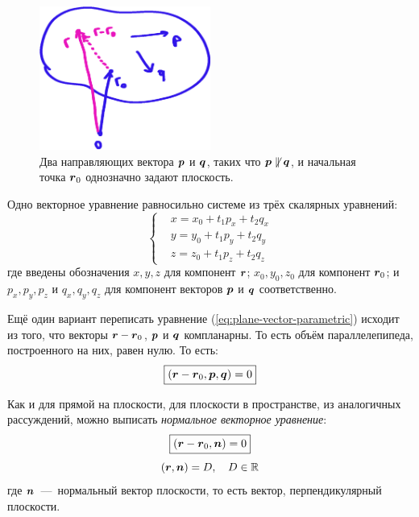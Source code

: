 \documentclass[a4paper,12pt]{article}
\begin{document}
  \begin{figure}[h]
    \centering
    
    \includegraphics[width=0.5\textwidth]{dot-and-two-vectors-on-the-plane}
    
    \caption{Два направляющих вектора $\boldsymbol p$ и $\boldsymbol q$, таких что $\bds p \hm{\not\parallel} \bds q$, и начальная точка $\boldsymbol r_0$ однозначно задают плоскость.}
    \label{fig:dot-and-two-vectors-on-the-plane}
  \end{figure}
  
  Одно векторное уравнение равносильно системе из трёх скалярных уравнений:
  \[
    \left\{
      \begin{aligned}
        &x = x_0 + t_1 p_x + t_2 q_x\\
        &y = y_0 + t_1 p_y + t_2 q_y\\
        &z = z_0 + t_1 p_z + t_2 q_z
      \end{aligned}
    \right.
  \]
  где введены обозначения $x, y, z$ для компонент $\boldsymbol r$; $x_0, y_0, z_0$ для компонент $\boldsymbol r_0$; и $p_x, p_y, p_z$ и $q_x, q_y, q_z$ для компонент векторов $\boldsymbol p$ и $\boldsymbol q$ соответственно.
  
  Ещё один вариант переписать уравнение (\ref{eq:plane-vector-parametric}) исходит из того, что векторы $\bds r \hm- \bds r_0$, $\boldsymbol p$ и $\boldsymbol q$ компланарны.
  То есть объём параллелепипеда, построенного на них, равен нулю.
  То есть:
  \[
    \boxed{
      (\boldsymbol r - \boldsymbol r_0, \boldsymbol p, \boldsymbol q) = 0
    }
  \]
  
  Как и для прямой на плоскости, для плоскости в пространстве, из аналогичных рассуждений, можно выписать \emph{нормальное векторное уравнение}:
  \begin{equation}\label{eq:plane-normal}
    \boxed{(\boldsymbol r - \boldsymbol r_0, \boldsymbol n) = 0}
  \end{equation}
  \[
    (\boldsymbol r, \boldsymbol n) = D,\quad D \in \operatorname{\mathbb R}
  \]
  где $\boldsymbol n$~---~нормальный вектор плоскости, то есть вектор, перпендикулярный плоскости.
  
\end{document}
